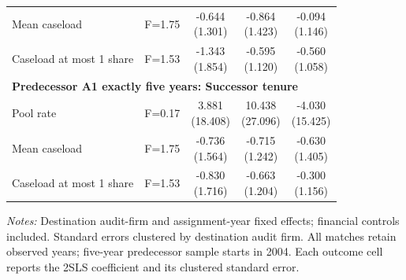 \documentclass[10pt]{article}
\begin{document}
\begin{minipage}{19cm}
\begin{threeparttable}
\begin{tabular}{p{}cccc}
Mean caseload & F=1.75 & \shortstack{-0.644\\(1.301)} & \shortstack{-0.864\\(1.423)} & \shortstack{-0.094\\(1.146)} \\
Caseload at most 1 share & F=1.53 & \shortstack{-1.343\\(1.854)} & \shortstack{-0.595\\(1.120)} & \shortstack{-0.560\\(1.058)} \\
\multicolumn{5}{l}{\textbf{Predecessor A1 exactly five years: Successor tenure}} \\
Pool rate & F=0.17 & \shortstack{3.881\\(18.408)} & \shortstack{10.438\\(27.096)} & \shortstack{-4.030\\(15.425)} \\
Mean caseload & F=1.75 & \shortstack{-0.736\\(1.564)} & \shortstack{-0.715\\(1.242)} & \shortstack{-0.630\\(1.405)} \\
Caseload at most 1 share & F=1.53 & \shortstack{-0.830\\(1.716)} & \shortstack{-0.663\\(1.204)} & \shortstack{-0.300\\(1.156)} \\
\bottomrule
\end{tabular}
\begin{tablenotes}\fontsize{9}{11}\selectfont
\item \raggedright \fontsize{9}{11}\selectfont \textit{Notes:} Destination audit-firm and assignment-year fixed effects; financial controls included. Standard errors clustered by destination audit firm. All matches retain observed years; five-year predecessor sample starts in 2004. Each outcome cell reports the 2SLS coefficient and its clustered standard error.
\end{tablenotes}
\end{threeparttable}

\end{minipage}
\end{document}
